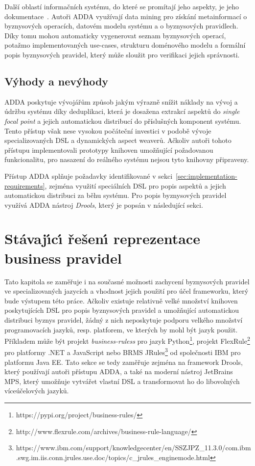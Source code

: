 Další oblastí informačních systému, do které se promítají jeho aspekty,
je jeho dokumentace~\cite{cemus2017automated}. Autoři \gls{ADDA}
využívají data mining pro získání metainformací o byznysových operacích,
datovém modelu systému a o byznysových pravidlech. Díky tomu mohou
automaticky vygenerovat seznam byznysových operací, potažmo implementovaných
use-cases, strukturu doménového modelu a formální popis byznysových pravidel,
který může sloužit pro verifikaci jejich správnosti.

\subsection{Výhody a nevýhody}

\gls{ADDA} poskytuje vývojářům způsob jakým výrazně snížit náklady na vývoj a údržbu
systému díky deduplikaci, která je dosažena extrakcí aspektů
do \textit{single focal point} a jejich automatickou distribucí do
příslušných komponent systému. Tento přístup však nese vysokou počáteční investici v
podobě vývoje specializovaných \gls{DSL} a dynamických aspect weaverů.
Ačkoliv autoři tohoto přístupu implementovali prototypy knihoven umožňující
požadovanou funkcionalitu, pro nasazení do reálného systému
nejsou tyto knihovny připraveny.

Přístup \gls{ADDA} splňuje požadavky identifikované v sekci~\ref{sec:implementation-requirements},
zejména využití speciálních \gls{DSL} pro popis aspektů a
jejich automatickou distribuci za běhu systému. Pro popis byznysových pravidel
využívá \gls{ADDA} nástroj \textit{Drools}, který je popsán v následující sekci.

\section{Stávaj\'{\i}c\'{\i} řešen\'{\i} reprezentace business pravidel}\label{sec:business-rule-dsl}

Tato kapitola se zaměřuje i na současné možnosti zachycení
byznysových pravidel ve specializovaných jazycích a vhodnost jejich použití
pro účel frameworku, který bude výstupem této práce.
Ačkoliv existuje relativně velké množství knihoven poskytujících
\gls{DSL} pro popis byznysových pravidel a umožňující automatickou
distribuci byznys pravidel, žádný z nich neposkytuje podporu velkého
množství programovacích jazyků, resp. platforem, ve kterých by mohl
být jazyk použit. Příkladem může být projekt \textit{business-ruless}
pro jazyk Python\footnote{https://pypi.org/project/business-rules/}, projekt FlexRule\footnote{http://www.flexrule.com/archives/business-rule-language/} pro platformy .NET a
JavaScript nebo \gls{BRMS} JRules\footnote{https://www.ibm.com/support/knowledgecenter/en/SSZJPZ\_11.3.0/com.ibm.swg.im.iis.conn.jrules.use.doc/topics/c\_jrules\_enginemode.html} od společnosti IBM pro platformu \gls{Java EE}.
Tato sekce se tedy zaměřuje zejména na framework Drools, který
používají autoři přístupu \gls{ADDA}, a také na moderní nástroj
JetBrains MPS, který umožňuje vytvářet vlastní \gls{DSL} a transformovat
ho do libovolných víceúčelových jazyků.

